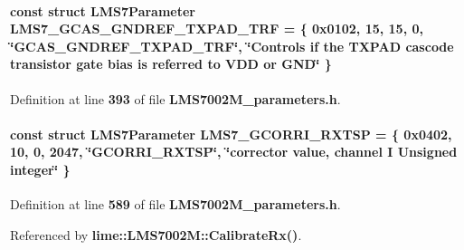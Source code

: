 \paragraph[{L\+M\+S7\+\_\+\+G\+C\+A\+S\+\_\+\+G\+N\+D\+R\+E\+F\+\_\+\+T\+X\+P\+A\+D\+\_\+\+T\+RF}]{\setlength{\rightskip}{0pt plus 5cm}const struct {\bf L\+M\+S7\+Parameter} L\+M\+S7\+\_\+\+G\+C\+A\+S\+\_\+\+G\+N\+D\+R\+E\+F\+\_\+\+T\+X\+P\+A\+D\+\_\+\+T\+RF = \{ 0x0102, 15, 15, 0, \char`\"{}\+G\+C\+A\+S\+\_\+\+G\+N\+D\+R\+E\+F\+\_\+\+T\+X\+P\+A\+D\+\_\+\+T\+R\+F\char`\"{}, \char`\"{}\+Controls if the T\+X\+P\+A\+D cascode transistor gate bias is referred to V\+D\+D or G\+N\+D\char`\"{} \}\hspace{0.3cm}{\ttfamily [static]}}\label{LMS7002M__parameters_8h_a69317dfb4e9d69ccbb38657dd188e3d2}


Definition at line {\bf 393} of file {\bf L\+M\+S7002\+M\+\_\+parameters.\+h}.

\paragraph[{L\+M\+S7\+\_\+\+G\+C\+O\+R\+R\+I\+\_\+\+R\+X\+T\+SP}]{\setlength{\rightskip}{0pt plus 5cm}const struct {\bf L\+M\+S7\+Parameter} L\+M\+S7\+\_\+\+G\+C\+O\+R\+R\+I\+\_\+\+R\+X\+T\+SP = \{ 0x0402, 10, 0, 2047, \char`\"{}\+G\+C\+O\+R\+R\+I\+\_\+\+R\+X\+T\+S\+P\char`\"{}, \char`\"{}corrector value, channel I Unsigned integer\char`\"{} \}\hspace{0.3cm}{\ttfamily [static]}}\label{LMS7002M__parameters_8h_a99a89ded9b3c0eeb4c16abfccc6ba9d1}


Definition at line {\bf 589} of file {\bf L\+M\+S7002\+M\+\_\+parameters.\+h}.



Referenced by {\bf lime\+::\+L\+M\+S7002\+M\+::\+Calibrate\+Rx()}.

